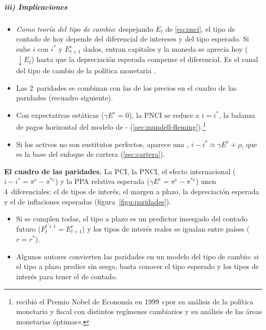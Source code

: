 \documentclass[11pt]{article}
\begin{document}
\begin{infografia}[H]
\centering
\caption{Los 2~caminos del inversor: cubierto (PCI) y sin cubrir (PNCI)}\label{figu:dos-caminos}
\end{infografia}

\subparagraph{iii) Implicaciones}
\begin{itemize}
\item \emph{Como teoría del tipo de cambio}: despejando $E_t$ de \eqref{eq:pnci}, el tipo de contado de hoy depende del diferencial de intereses y del tipo esperado. Si sube $i$ con $i^*$ y $E^e_{t+1}$ dados, entran capitales y la moneda se aprecia hoy ($\downarrow E_t$) hasta que la depreciación esperada compense el diferencial. Es el canal del tipo de cambio de la política monetaria .
\item Las 2~paridades se combinan con las de los precios en el cuadro de las paridades (recuadro siguiente).
\item Con expectativas estáticas ($\gamma E^e=0$), la PNCI se reduce a $i=i^*$, la balanza de pagos horizontal del modelo de - (\ref{sec:mundell-fleming}).\footnote{ recibió el Premio Nobel de Economía en 1999 «por su análisis de la política monetaria y fiscal con distintos regímenes cambiarios y su análisis de las áreas monetarias óptimas»\nocite{Nobel1999Mundell}.}
\item Si los activos no son sustitutos perfectos, aparece una , $i-i^*\approx\gamma E^e+\rho$, que es la base del enfoque de cartera (\ref{sec:cartera}).
\end{itemize}

\begin{anotaciones}[unbreakable]
\textbf{El cuadro de las paridades.} La PCI, la PNCI, el efecto  internacional ($i-i^*=\pi^e-\pi^{*e}$) y la PPA relativa esperada ($\gamma E^e=\pi^e-\pi^{*e}$) unen 4~diferenciales: el de tipos de interés, el margen a plazo, la depreciación esperada y el de inflaciones esperadas (figura~\ref{figu:paridades}).
\begin{itemize}
\item Si se cumplen todas, el tipo a plazo es un predictor insesgado del contado futuro ($F_t^{t+1}=E^e_{t+1}$) y los tipos de interés reales se igualan entre países ($r=r^*$).
\item Algunos autores convierten las paridades en un modelo del tipo de cambio: si el tipo a plazo predice sin sesgo, basta conocer el tipo esperado y los tipos de interés para tener el de contado\nocite{HelliwellBoothe1983,Gandolfo2002International}.
\end{itemize}
\begin{infografiacaja}
\caption{El cuadro de las paridades}\label{figu:paridades}
\end{infografiacaja}
\end{anotaciones}
\end{document}
